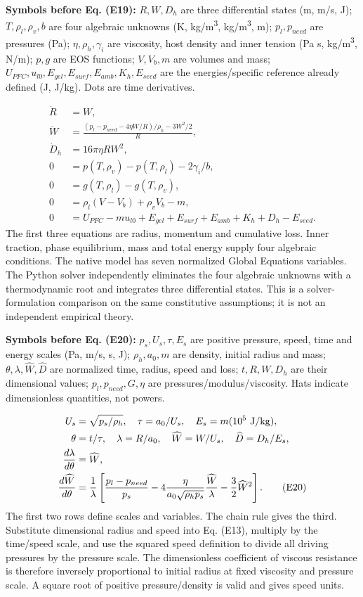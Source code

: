 \documentclass[10pt,a4paper]{article}
\begin{document}
\textbf{Symbols before Eq. (E19):} $R,W,D_h$ are three differential states (m, m/s, J); $T,\rho_l,\rho_v,b$ are four algebraic unknowns (K, kg/m\textsuperscript{3}, kg/m\textsuperscript{3}, m); $p_l,p_{need}$ are pressures (Pa); $\eta,\rho_h,\gamma_i$ are viscosity, host density and inner tension (Pa s, kg/m\textsuperscript{3}, N/m); $p,g$ are EOS functions; $V,V_b,m$ are volumes and mass; $U_{PFC},u_{l0},E_{gel},E_{surf},E_{amb},K_h,E_{seed}$ are the energies/specific reference already defined (J, J/kg). Dots are time derivatives.

{\small\begin{align*}
\dot R&=W,\\
\dot W&=\frac{(p_l-p_{need}-4\eta W/R)/\rho_h-3W^2/2}{R},\\
\dot D_h&=16\pi\eta R W^2,\\
0&=p(T,\rho_v)-p(T,\rho_l)-2\gamma_i/b,\\
0&=g(T,\rho_l)-g(T,\rho_v),\\
0&=\rho_l(V-V_b)+\rho_vV_b-m,\\
0&=U_{PFC}-m u_{l0}+E_{gel}+E_{surf}+E_{amb}+K_h+D_h-E_{seed}.
\tag{E19}
\end{align*}}
The first three equations are radius, momentum and cumulative loss. Inner traction, phase equilibrium, mass and total energy supply four algebraic conditions. The native model has seven normalized Global Equations variables. The Python solver independently eliminates the four algebraic unknowns with a thermodynamic root and integrates three differential states. This is a solver-formulation comparison on the same constitutive assumptions; it is not an independent empirical theory.

\textbf{Symbols before Eq. (E20):} $p_s,U_s,\tau,E_s$ are positive pressure, speed, time and energy scales (Pa, m/s, s, J); $\rho_h,a_0,m$ are density, initial radius and mass; $\theta,\lambda,\widehat W,\widehat D$ are normalized time, radius, speed and loss; $t,R,W,D_h$ are their dimensional values; $p_l,p_{need},G,\eta$ are pressures/modulus/viscosity. Hats indicate dimensionless quantities, not powers.

{\small\begin{align*}
U_s&=\sqrt{p_s/\rho_h},\quad \tau=a_0/U_s,\quad E_s=m(10^5\ {\rm J/kg}),\\
\theta&=t/\tau,\quad\lambda=R/a_0,\quad\widehat W=W/U_s,\quad\widehat D=D_h/E_s,\\
\frac{d\lambda}{d\theta}&=\widehat W,\\
\frac{d\widehat W}{d\theta}
&=\frac1\lambda\left[\frac{p_l-p_{need}}{p_s}
-4\frac{\eta}{a_0\sqrt{\rho_h p_s}}\frac{\widehat W}{\lambda}
-\frac32\widehat W^2\right]. \tag{E20}
\end{align*}}
The first two rows define scales and variables. The chain rule gives the third. Substitute dimensional radius and speed into Eq. (E13), multiply by the time/speed scale, and use the squared speed definition to divide all driving pressures by the pressure scale. The dimensionless coefficient of viscous resistance is therefore inversely proportional to initial radius at fixed viscosity and pressure scale. A square root of positive pressure/density is valid and gives speed units.
\end{document}
